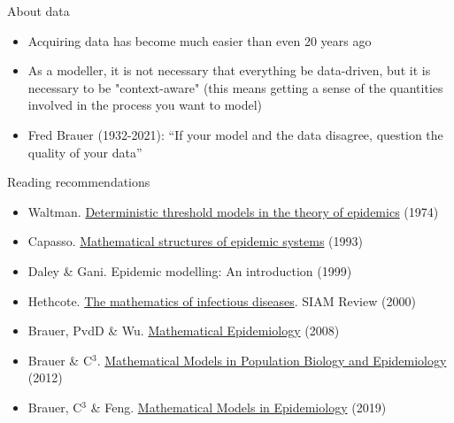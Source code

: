\documentclass[aspectratio=169]{beamer}\usepackage[]{graphicx}\usepackage[]{xcolor}
\begin{document}
\begin{frame}{About data}
	\begin{itemize}
		\item Acquiring data has become much easier than even 20 years ago
		\vfill
		\item As a modeller, it is not necessary that everything be data-driven, but it is necessary to be "context-aware" (this means getting a sense of the quantities involved in the process you want to model)
		\vfill
		\item Fred Brauer (1932-2021): ``If your model and the data disagree, question the quality of your data''
	\end{itemize}
\end{frame}


\begin{frame}{Reading recommendations}
    \begin{itemize}
    \item Waltman. \href{https://doi.org/10.1007/978-3-642-80820-3}{Deterministic threshold models in the theory of epidemics} (1974)
    \nocite{waltman2013deterministic}
		\vfill
    \item Capasso. \href{https://doi.org/10.1007/978-3-540-70514-7}{Mathematical structures of epidemic systems} (1993)
    \nocite{capasso1993mathematical}
		\vfill
    \item Daley \& Gani. Epidemic modelling: An introduction (1999)
    \nocite{daley1999epidemic}
		\vfill
    \item Hethcote. \href{https://doi.org/10.1137/S0036144500371907}{The mathematics of infectious diseases}. SIAM Review (2000)
    \nocite{Hethcote2000}
		\vfill
    \item Brauer, PvdD \& Wu. \href{https://doi.org/10.1007/978-3-540-78911-6}{Mathematical Epidemiology} (2008)
    \nocite{brauer2008mathematical}
		\vfill
    \item Brauer \& C$^3$. \href{https://doi.org/10.1007/978-1-4614-1686-9}{Mathematical Models in Population Biology and Epidemiology} (2012)
    \nocite{brauer2012mathematical}
		\vfill
    \item Brauer, C$^3$ \& Feng. \href{https://doi.org/10.1007/978-1-4939-9828-9}{Mathematical Models in Epidemiology} (2019)
    \nocite{brauer2019mathematical}
    \end{itemize}
\end{frame}
\end{document}
